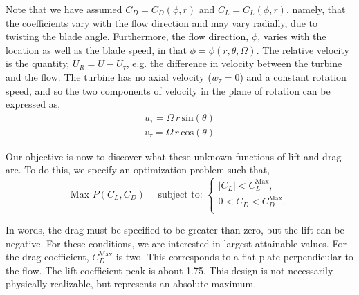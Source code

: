 Note that we have assumed $C_D = C_D(\phi,r)$ and $C_L = C_L(\phi,r)$,
namely, that the coefficients vary with the flow direction and may vary
radially, due to twisting the blade angle. Furthermore, the flow
direction, $\phi$, varies with the location as well as the blade speed,
in that $\phi=\phi(r,\theta,\Omega)$. The relative velocity is the
quantity, $U_R = U - U_\tau$, e.g. the difference in velocity between
the turbine and the flow. The turbine has no axial velocity ($w_\tau = 0$) and a
constant rotation speed, and so the two components of velocity in the
plane of rotation can be expressed as,
\begin{align}
 u_\tau = \Omega \,r\, \text{sin}(\theta)\\
 v_\tau = \Omega \,r\, \text{cos}(\theta)
\end{align}

Our objective is now to discover what these unknown functions of lift
and drag are. To do this, we specify an optimization problem such that, 
\begin{equation*} 
 \text{Max } P(C_L,C_D) \quad \text{ subject to: }
  \begin{cases}
   |C_L| < C_L^{\text{Max}}, \\
   0 < C_D < C_D^{\text{Max}}. \\
  \end{cases}
\end{equation*}

In words, the drag must be specified to be greater than zero, but
the lift can be negative. For these conditions, we are interested in
largest attainable values. For the drag coefficient, $C_D^{\text{Max}}$
is two. %
This corresponds to a flat plate perpendicular to the flow.
The lift coefficient peak is about 1.75. This design is not necessarily
physically realizable, but represents an absolute maximum. 

